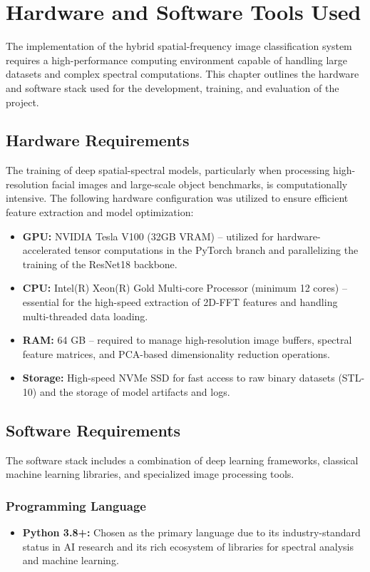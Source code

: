 \chapter{Hardware and Software Tools Used}
\label{ch:tools}

The implementation of the hybrid spatial-frequency image classification system requires a high-performance computing environment capable of handling large datasets and complex spectral computations. This chapter outlines the hardware and software stack used for the development, training, and evaluation of the project.

\section{Hardware Requirements}
The training of deep spatial-spectral models, particularly when processing high-resolution facial images and large-scale object benchmarks, is computationally intensive. The following hardware configuration was utilized to ensure efficient feature extraction and model optimization:

\begin{itemize}
    \item \textbf{GPU:} NVIDIA Tesla V100 (32GB VRAM) – utilized for hardware-accelerated tensor computations in the PyTorch branch and parallelizing the training of the ResNet18 backbone.
    \item \textbf{CPU:} Intel(R) Xeon(R) Gold Multi-core Processor (minimum 12 cores) – essential for the high-speed extraction of 2D-FFT features and handling multi-threaded data loading.
    \item \textbf{RAM:} 64 GB – required to manage high-resolution image buffers, spectral feature matrices, and PCA-based dimensionality reduction operations.
    \item \textbf{Storage:} High-speed NVMe SSD for fast access to raw binary datasets (STL-10) and the storage of model artifacts and logs.
\end{itemize}

\section{Software Requirements}
The software stack includes a combination of deep learning frameworks, classical machine learning libraries, and specialized image processing tools.

\subsection{Programming Language}
\begin{itemize}
    \item \textbf{Python 3.8+:} Chosen as the primary language due to its industry-standard status in AI research and its rich ecosystem of libraries for spectral analysis and machine learning.
\end{itemize}

